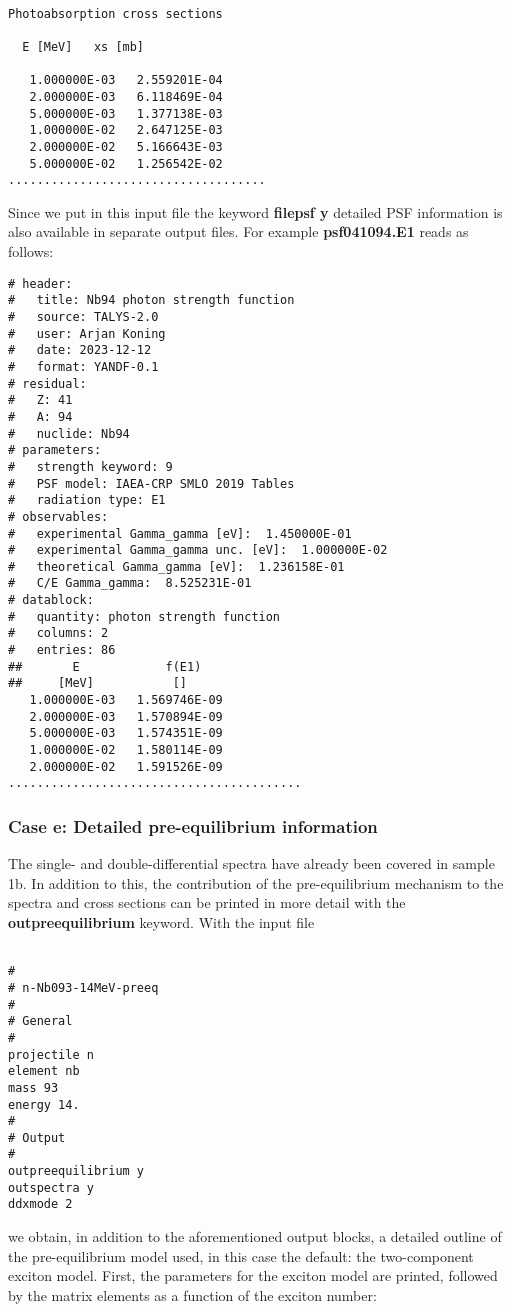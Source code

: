 \begin{samplecase}
{\small \begin{verbatim}

Photoabsorption cross sections

  E [MeV]   xs [mb]

   1.000000E-03   2.559201E-04
   2.000000E-03   6.118469E-04
   5.000000E-03   1.377138E-03
   1.000000E-02   2.647125E-03
   2.000000E-02   5.166643E-03
   5.000000E-02   1.256542E-02
....................................
\end{verbatim} } \renewcommand{\baselinestretch}{1.07}\small\normalsize
Since we put in this input file the keyword {\bf filepsf y} detailed
PSF information is also available in separate output files. For example
{\bf psf041094.E1} reads as follows:
{\small \begin{verbatim}
# header:
#   title: Nb94 photon strength function
#   source: TALYS-2.0
#   user: Arjan Koning
#   date: 2023-12-12
#   format: YANDF-0.1
# residual:
#   Z: 41
#   A: 94
#   nuclide: Nb94
# parameters:
#   strength keyword: 9
#   PSF model: IAEA-CRP SMLO 2019 Tables
#   radiation type: E1
# observables:
#   experimental Gamma_gamma [eV]:  1.450000E-01
#   experimental Gamma_gamma unc. [eV]:  1.000000E-02
#   theoretical Gamma_gamma [eV]:  1.236158E-01
#   C/E Gamma_gamma:  8.525231E-01
# datablock:
#   quantity: photon strength function
#   columns: 2
#   entries: 86
##       E            f(E1)
##     [MeV]           []
   1.000000E-03   1.569746E-09
   2.000000E-03   1.570894E-09
   5.000000E-03   1.574351E-09
   1.000000E-02   1.580114E-09
   2.000000E-02   1.591526E-09
.........................................
\end{verbatim} } \renewcommand{\baselinestretch}{1.07}\small\normalsize

\subsubsection{Case e: Detailed pre-equilibrium information}
The single- and double-differential spectra have already been covered in 
sample 1b. In addition to this, the contribution of the pre-equilibrium 
mechanism to the spectra 
and cross sections can be printed in more detail with the 
{\bf outpreequilibrium} keyword.
With the input file

{\small \begin{verbatim}

#
# n-Nb093-14MeV-preeq
#
# General
#
projectile n
element nb
mass 93
energy 14.
#
# Output
#
outpreequilibrium y 
outspectra y
ddxmode 2
\end{verbatim} } \renewcommand{\baselinestretch}{1.07}\small\normalsize
\noindent
we obtain, in addition to the aforementioned output blocks, a detailed outline
of the pre-equilibrium model used, in this case the default: the two-component 
exciton model.
First, the parameters for the exciton model are printed, followed by
the matrix elements as a function of the exciton number:


\end{samplecase}
